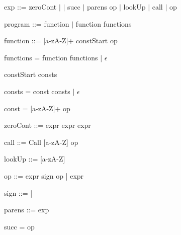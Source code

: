 exp ::= zeroCont $\mid$  $\mid$ succ $\mid$ parens op $\mid$ lookUp $\mid$ call $\mid$ op

program ::= function $\mid$ function functions

function ::= [a-zA-Z]+ \bnf{=>} constStart op

functions = \bnf{,} function functions $\mid$ $\epsilon$

constStart \bnf{[} consts \bnf{]}

consts = const \bnf{,} consts $\mid$ $\epsilon$

const = [a-zA-Z]+ \bnf{=} op

zeroCont ::=  \bnf{(} expr \bnf{)} \bnf{\{} expr \bnf{\}}  \bnf{\{} expr \bnf{\}}

call ::= Call [a-zA-Z] op

lookUp ::=  [a-zA-Z] 

op ::= expr sign op | expr

sign ::= \bnf{+} | \bnf{*}  

parens ::=\bnf{(} exp \bnf{)}

succ =  op

